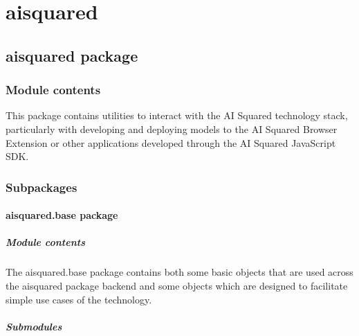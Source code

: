 \documentclass[letterpaper,10pt,english]{sphinxmanual}
\begin{document}
\sphinxstepscope


\section{aisquared}
\label{\detokenize{modules:aisquared}}\label{\detokenize{modules::doc}}
\sphinxstepscope


\subsection{aisquared package}
\label{\detokenize{aisquared:aisquared-package}}\label{\detokenize{aisquared::doc}}

\subsubsection{Module contents}
\label{\detokenize{aisquared:module-aisquared}}\label{\detokenize{aisquared:module-contents}}
\sphinxAtStartPar
This package contains utilities to interact with the AI Squared technology stack, particularly with developing and deploying models to the AI Squared Browser Extension or other applications developed through the AI Squared JavaScript SDK.


\subsubsection{Subpackages}
\label{\detokenize{aisquared:subpackages}}
\sphinxstepscope


\paragraph{aisquared.base package}
\label{\detokenize{aisquared.base:aisquared-base-package}}\label{\detokenize{aisquared.base::doc}}

\subparagraph{Module contents}
\label{\detokenize{aisquared.base:module-aisquared.base}}\label{\detokenize{aisquared.base:module-contents}}
\sphinxAtStartPar
The aisquared.base package contains both some basic objects that are used across the aisquared package backend and some objects which are designed to facilitate simple use cases of the technology.


\subparagraph{Submodules}
\label{\detokenize{aisquared.base:submodules}}
\end{document}
